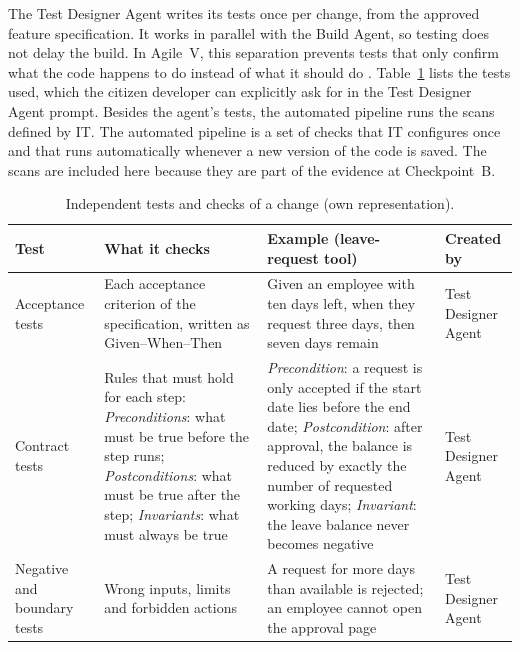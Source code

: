 \documentclass[10pt,a4paper]{article}
\begin{document}
 The Test Designer Agent writes its tests once
per change, from the approved feature specification. It works in parallel with the Build Agent, so
testing does not delay the build. In Agile~V, this separation prevents tests
that only confirm what the code happens to do instead of what it should do
\parencite{koch2026agile}. Table~\ref{tab:change-tests} lists the tests used, which the citizen developer can explicitly ask for in the Test Designer Agent prompt.
Besides the agent's tests, the automated pipeline runs the scans defined by
IT. The automated pipeline is a set of checks that IT configures once and
that runs automatically whenever a new version of the code is saved. The
scans are included here because they are part of the evidence at
Checkpoint~B.
\begin{table}[H]
    \centering
    \small
    \caption{Independent tests and checks of a change (own representation).}
    \label{tab:change-tests}
    \begin{tabular}{p{2.5cm} p{4.4cm} p{4.4cm} p{2.3cm}}
    \hline
    \textbf{Test} & \textbf{What it checks} & \textbf{Example (leave-request
        tool)} & \textbf{Created by} \\
    \hline
    Acceptance tests & Each acceptance criterion of the specification,
        written as Given--When--Then & Given an employee with ten days left,
        when they request three days, then seven days remain & Test Designer
        Agent \\
    Contract tests & Rules that must hold for each step:\newline
        \emph{Preconditions}: what must be true before the step
        runs;\newline
        \emph{Postconditions}: what must be true after the step;\newline
        \emph{Invariants}: what must always be true &
        \emph{Precondition}: a request is only accepted if the start date
        lies before the end date;\newline
        \emph{Postcondition}: after approval, the balance is reduced by
        exactly the number of requested working days;\newline
        \emph{Invariant}: the leave balance never becomes negative &
        Test Designer Agent \\
    Negative and boundary tests & Wrong inputs, limits and forbidden
        actions & A request for more days than available is rejected; an
        employee cannot open the approval page & Test Designer Agent \\

\end{tabular}
\end{table}
\end{document}
